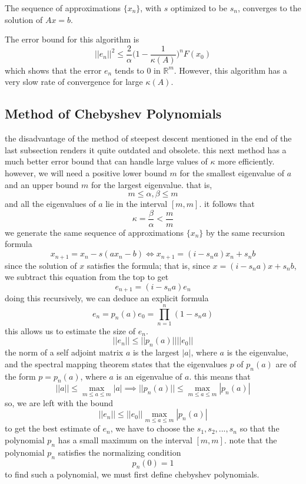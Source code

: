   \begin{theorem}
  The sequence of approximations $\{x_n\}$, with $s$ optimized to be $s_n$, converges to the solution of $A x = b$. 
  \end{theorem}

  The error bound for this algorithm is 
  \[||e_n||^2 \leq \frac{2}{\alpha} \bigg( 1-\frac{1}{\kappa(A)} \bigg)^n F(x_0)\]
  which shows that the error $e_n$ tends to $0$ in $\mathbb{R}^m$. However, this algorithm has a very slow rate of convergence for large $\kappa(A)$. 

\subsection{Method of Chebyshev Polynomials}

  the disadvantage of the method of steepest descent mentioned in the end of the last subsection renders it quite outdated and obsolete. this next method has a much better error bound that can handle large values of $\kappa$ more efficiently. however, we will need a positive lower bound $m$ for the smallest eigenvalue of $a$ and an upper bound $m$ for the largest eigenvalue. that is, 
  \[m \leq \alpha, \beta \leq m\]
  and all the eigenvalues of $a$ lie in the interval $[m, m]$. it follows that
  \[\kappa = \frac{\beta}{\alpha} < \frac{m}{m}\]
  we generate the same sequence of approximations $\{x_n\}$ by the same recursion formula
  \[x_{n+1} = x_n - s(a x_n - b) \iff x_{n+1} = (i - s_n a) x_n + s_n b\]
  since the solution of $x$ satisfies the formula; that is, since $x = (i - s_n a) x + s_n b$, we subtract this equation from the top to get
  \[e_{n+1} = (i - s_n a) e_n\]
  doing this recursively, we can deduce an explicit formula 
  \[e_n = p_n (a) e_0 = \prod_{n=1}^n (1 - s_n a)\]
  this allows us to estimate the size of $e_n$. 
  \[||e_n|| \leq ||p_n (a)|| ||e_0||\]
  the norm of a self adjoint matrix $a$ is the largest $|a|$, where $a$ is the eigenvalue, and the spectral mapping theorem states that the eigenvalues $p$ of $p_n (a)$ are of the form $p = p_n (a)$, where $a$ is an eigenvalue of $a$. this means that
  \[||a|| \leq \max_{m \leq a \leq m} |a| \implies ||p_n (a)|| \leq \max_{m \leq a \leq m} |p_n (a)|\]
  so, we are left with the bound
  \[||e_n|| \leq ||e_0|| \max_{m \leq a \leq m} |p_n (a)|\]
  to get the best estimate of $e_n$, we have to choose the $s_1, s_2, ..., s_n$ so that the polynomial $p_n$ has a small maximum on the interval $[m, m]$. note that the polynomial $p_n$ satisfies the normalizing condition 
  \[p_n(0) = 1\]
  to find such a polynomial, we must first define chebyshev polynomials. 

